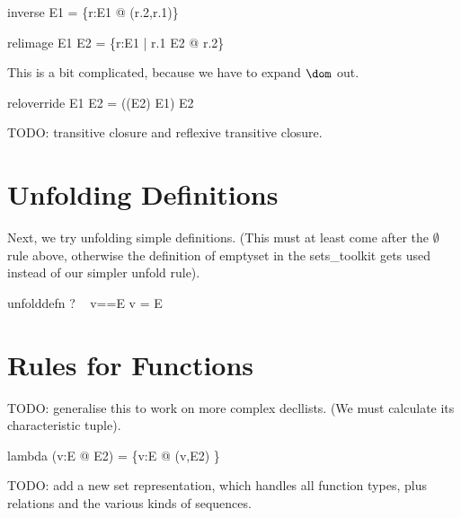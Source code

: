 \documentclass{article}
\begin{document}
\begin{zedrule}{inverse}
   E1 \inv = \{r:E1 @ (r.2,r.1)\}
\end{zedrule}

\begin{zedrule}{relimage}
   E1 \limg E2 \rimg = \{r:E1 | r.1 \in E2 @ r.2\}
\end{zedrule}

This is a bit complicated, because we have to expand $\dom$ out.
\begin{zedrule}{reloverride}
   E1 \oplus E2 = ((\dom E2) \ndres E1) \cup E2
\end{zedrule}

TODO: transitive closure and reflexive transitive closure.


\section{Unfolding Definitions}

Next, we try unfolding simple definitions.
(This must at least come after the $\emptyset$ rule above,
otherwise the definition of emptyset in the sets\_toolkit
gets used instead of our simpler unfold rule).

\begin{zedrule}{unfolddefn}
  \proviso? ~ v==E
\derives
   v = E
\end{zedrule}


\section{Rules for Functions}

TODO: generalise this to work on more complex decllists.
(We must calculate its characteristic tuple).
\begin{zedrule}{lambda}
   (\lambda v:E @ E2) = \{v:E @ (v,E2) \}
\end{zedrule}


TODO: add a new set representation, which handles all function types,
plus relations and the various kinds of sequences.
\end{document}
